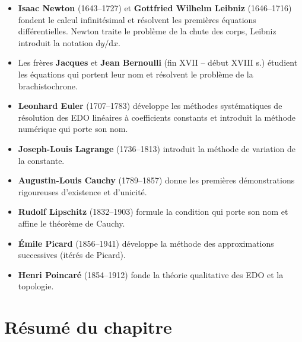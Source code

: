 \documentclass[12pt,a4paper,openany]{book}
\theoremstyle{definition}
\theoremstyle{plain}
\theoremstyle{remark}
\newcommand{\dd}{\mathrm{d}}
\begin{document}
\begin{itemize}[leftmargin=*]
\item \textbf{Isaac Newton} (1643--1727) et \textbf{Gottfried Wilhelm Leibniz} (1646--1716) fondent le calcul infinitésimal et résolvent les premières équations différentielles. Newton traite le problème de la chute des corps, Leibniz introduit la notation $\dd y / \dd x$.
\item Les frères \textbf{Jacques} et \textbf{Jean Bernoulli} (fin XVII -- début XVIII s.) étudient les équations qui portent leur nom et résolvent le problème de la brachistochrone.
\item \textbf{Leonhard Euler} (1707--1783) développe les méthodes systématiques de résolution des EDO linéaires à coefficients constants et introduit la méthode numérique qui porte son nom.
\item \textbf{Joseph-Louis Lagrange} (1736--1813) introduit la méthode de variation de la constante.
\item \textbf{Augustin-Louis Cauchy} (1789--1857) donne les premières démonstrations rigoureuses d'existence et d'unicité.
\item \textbf{Rudolf Lipschitz} (1832--1903) formule la condition qui porte son nom et affine le théorème de Cauchy.
\item \textbf{Émile Picard} (1856--1941) développe la méthode des approximations successives (itérés de Picard).
\item \textbf{Henri Poincaré} (1854--1912) fonde la théorie qualitative des EDO et la topologie.
\end{itemize}

\section{Résumé du chapitre}
\label{sec:resume-ch1}
\end{document}
